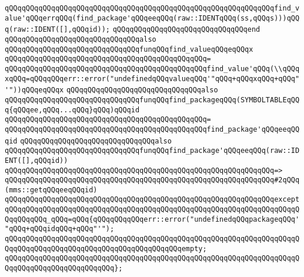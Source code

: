 \verb|qQQqqQQqqQQqqQQqqQQqqQQqqQQqqQQqqQQqqQQqqQQqqQQqqQQqqQQqqQQqqQQqfind_value'qQQqerrqQQq(find_package'qQQqeeqQQq(raw::IDENTqQQq(ss,qQQqs)))qQQq(raw::IDENT([],qQQqid));|\newline
\verb|qQQqqQQqqQQqqQQqqQQqqQQqqQQqqQQqend|\newline
\newline
\verb|qQQqqQQqqQQqqQQqqQQqqQQqqQQqqQQqalso|\newline
\verb|qQQqqQQqqQQqqQQqqQQqqQQqqQQqqQQqfunqQQqfind_valueqQQqeqQQqx|\newline
\verb|qQQqqQQqqQQqqQQqqQQqqQQqqQQqqQQqqQQqqQQqqQQqqQQq=|\newline
\verb|qQQqqQQqqQQqqQQqqQQqqQQqqQQqqQQqqQQqqQQqqQQqqQQqfind_value'qQQq(\\qQQqxqQQq=qQQqqQQqerr::error("undefinedqQQqvalueqQQq'"qQQq+qQQqxqQQq+qQQq"'"))qQQqeqQQqx|\newline
\newline
\verb|qQQqqQQqqQQqqQQqqQQqqQQqqQQqqQQqalso|\newline
\verb|qQQqqQQqqQQqqQQqqQQqqQQqqQQqqQQqfunqQQqfind_packageqQQq(SYMBOLTABLEqQQq{qQQqee,qQQq...qQQq}qQQq)qQQqid|\newline
\verb|qQQqqQQqqQQqqQQqqQQqqQQqqQQqqQQqqQQqqQQqqQQqqQQq=|\newline
\verb|qQQqqQQqqQQqqQQqqQQqqQQqqQQqqQQqqQQqqQQqqQQqqQQqfind_package'qQQqeeqQQqid|\newline
\newline
\verb|qQQqqQQqqQQqqQQqqQQqqQQqqQQqqQQqalso|\newline
\verb|qQQqqQQqqQQqqQQqqQQqqQQqqQQqqQQqfunqQQqfind_package'qQQqeeqQQq(raw::IDENT([],qQQqid))|\newline
\verb|qQQqqQQqqQQqqQQqqQQqqQQqqQQqqQQqqQQqqQQqqQQqqQQqqQQqqQQqqQQqqQQq=>|\newline
\verb|qQQqqQQqqQQqqQQqqQQqqQQqqQQqqQQqqQQqqQQqqQQqqQQqqQQqqQQqqQQqqQQq#2qQQq(mms::getqQQqeeqQQqid)|\newline
\verb|qQQqqQQqqQQqqQQqqQQqqQQqqQQqqQQqqQQqqQQqqQQqqQQqqQQqqQQqqQQqqQQqexcept|\newline
\verb|qQQqqQQqqQQqqQQqqQQqqQQqqQQqqQQqqQQqqQQqqQQqqQQqqQQqqQQqqQQqqQQqqQQqqQQqqQQqqQQq_qQQq=qQQq{qQQqqQQqqQQqerr::error("undefinedqQQqpackageqQQq'"qQQq+qQQqidqQQq+qQQq"'");|\newline
\verb|qQQqqQQqqQQqqQQqqQQqqQQqqQQqqQQqqQQqqQQqqQQqqQQqqQQqqQQqqQQqqQQqqQQqqQQqqQQqqQQqqQQqqQQqqQQqqQQqqQQqqQQqqQQqqQQqempty;|\newline
\verb|qQQqqQQqqQQqqQQqqQQqqQQqqQQqqQQqqQQqqQQqqQQqqQQqqQQqqQQqqQQqqQQqqQQqqQQqqQQqqQQqqQQqqQQqqQQqqQQq};|\newline
